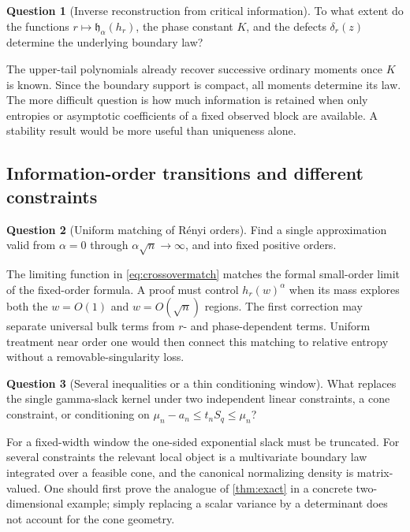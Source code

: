 \documentclass[11pt,oneside]{article}
\numberwithin{equation}{section}
\theoremstyle{plain}
\theoremstyle{definition}
\newtheorem{question}{Question}
\theoremstyle{remark}
\begin{document}
\begin{question}[Inverse reconstruction from critical information]
To what extent do the functions $r\mapsto\mathfrak h_\alpha(h_r)$,
the phase constant $K$, and the defects $\delta_r(z)$ determine the
underlying boundary law?
\end{question}
The upper-tail polynomials already recover successive ordinary
moments once $K$ is known. Since the boundary support is compact,
all moments determine its law. The more difficult question is how
much information is retained when only entropies or asymptotic
coefficients of a fixed observed block are available. A stability
result would be more useful than uniqueness alone.

\subsection{Information-order transitions and different constraints}
\begin{question}[Uniform matching of R\'enyi orders]
Find a single approximation valid from $\alpha=0$ through
$\alpha\sqrt n\to\infty$, and into fixed positive orders.
\end{question}
The limiting function in \eqref{eq:crossovermatch} matches the
formal small-order limit of the fixed-order formula. A proof must
control $h_r(w)^\alpha$ when its mass explores both the
$w=O(1)$ and $w=O(\sqrt n)$ regions. The first correction may
separate universal bulk terms from $r$- and phase-dependent terms.
Uniform treatment near order one would then connect this matching
to relative entropy without a removable-singularity loss.

\begin{question}[Several inequalities or a thin conditioning window]
What replaces the single gamma-slack kernel under two independent
linear constraints, a cone constraint, or conditioning on
$\mu_n-a_n\le t_nS_q\le\mu_n$?
\end{question}
For a fixed-width window the one-sided exponential slack must be
truncated. For several constraints the relevant local object is a
multivariate boundary law integrated over a feasible cone, and the
canonical normalizing density is matrix-valued. One should first
prove the analogue of \cref{thm:exact} in a concrete two-dimensional
example; simply replacing a scalar variance by a determinant does
not account for the cone geometry.
\end{document}

